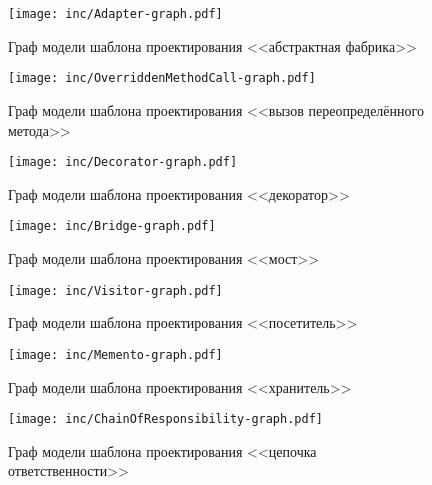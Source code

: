\begin{figure}[!ht]
\centering
\texttt{[image: inc/Adapter-graph.pdf]}
\caption{Граф модели шаблона проектирования <<абстрактная фабрика>>}
\label{fig:Adapter-graph}
\end{figure}

\begin{figure}[!ht]
\centering
\texttt{[image: inc/OverriddenMethodCall-graph.pdf]}
\caption{Граф модели шаблона проектирования <<вызов переопределённого метода>>}
\label{fig:OverriddenMethodCall-graph}
\end{figure}

\begin{figure}[!ht]
\centering
\texttt{[image: inc/Decorator-graph.pdf]}
\caption{Граф модели шаблона проектирования <<декоратор>>}
\label{fig:Decorator-graph}
\end{figure}

\begin{figure}[!ht]
\centering
\texttt{[image: inc/Bridge-graph.pdf]}
\caption{Граф модели шаблона проектирования <<мост>>}
\label{fig:Bridge-graph}
\end{figure}

\begin{figure}[!ht]
\centering
\texttt{[image: inc/Visitor-graph.pdf]}
\caption{Граф модели шаблона проектирования <<посетитель>>}
\label{fig:Visitor-graph}
\end{figure}

\begin{figure}[!ht]
\centering
\texttt{[image: inc/Memento-graph.pdf]}
\caption{Граф модели шаблона проектирования <<хранитель>>}
\label{fig:Memento-graph}
\end{figure}

\begin{figure}[!ht]
\centering
\texttt{[image: inc/ChainOfResponsibility-graph.pdf]}
\caption{Граф модели шаблона проектирования <<цепочка ответственности>>}
\label{fig:ChainOfResponsibility-graph}
\end{figure}

